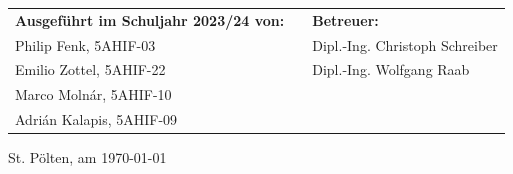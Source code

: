 \begin{flushleft}
    \large
    \vspace{3cm}
    
    \begin{small}
        \begin{tabular}{lp{2cm}l}
            \textbf{Ausgeführt im Schuljahr 2023/24 von:} & & \textbf{Betreuer:} \\
            Philip Fenk, 5AHIF-03 & & Dipl.-Ing. Christoph Schreiber \\
            Emilio Zottel, 5AHIF-22 & & Dipl.-Ing. Wolfgang Raab \\
            Marco Molnár, 5AHIF-10 \\
            Adrián Kalapis, 5AHIF-09
        \end{tabular}
    \end{small}
\end{flushleft}

\vspace{1cm}

St. Pölten, am \today
